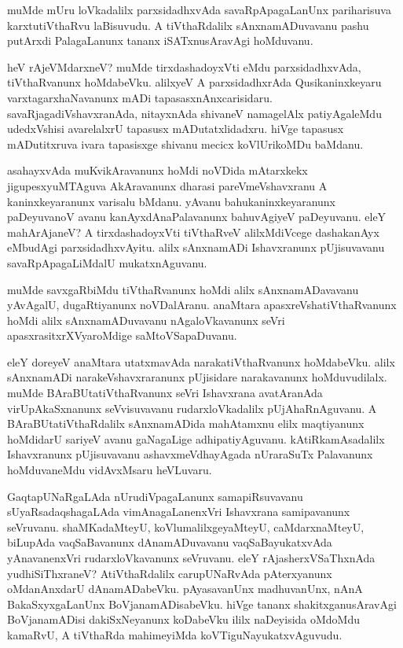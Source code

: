 \documentclass{article}
\begin{document}
\begin{mn}
muMde mUru loVkadalilx parxsidadhxvAda savaRpApagaLanUnx pariharisuva karxtutiVthaRvu laBisuvudu.
A tiVthaRdalilx sAnxnamADuvavanu pashu putArxdi PalagaLanunx tananx iSATxnusAravAgi hoMduvanu.
\end{mn}

\begin{mn}
heV rAjeVMdarxneV? muMde tirxdashadoyxVti eMdu parxsidadhxvAda, tiVthaRvanunx hoMdabeVku. 
alilxyeV A parxsidadhxrAda Qusikaninxkeyaru varxtagarxhaNavanunx mADi tapasasxnAnxcarisidaru. 
savaRjagadiVshavxranAda, nitayxnAda shivaneV namagelAlx patiyAgaleMdu udedxVshisi avarelalxrU 
tapasusx mADutatxlidadxru. hiVge tapasusx mADutitxruva ivara tapasisxge shivanu mecicx 
koVlUrikoMDu baMdanu.
\end{mn}

\begin{mn}
asahayxvAda muKvikAravanunx hoMdi noVDida mAtarxkekx jigupesxyuMTAguva AkAravanunx dharasi 
pareVmeVshavxranu A kaninxkeyaranunx varisalu bMdanu. yAvanu bahukaninxkeyaranunx paDeyuvanoV 
avanu kanAyxdAnaPalavanunx bahuvAgiyeV paDeyuvanu. eleY mahArAjaneV? A tirxdashadoyxVti tiVthaRveV
alilxMdiVcege dashakanAyx eMbudAgi parxsidadhxvAyitu. alilx sAnxnamADi Ishavxranunx pUjisuvavanu 
savaRpApagaLiMdalU mukatxnAguvanu.
\end{mn}

\begin{mn}
muMde savxgaRbiMdu tiVthaRvanunx hoMdi alilx sAnxnamADavavanu yAvAgalU, dugaRtiyanunx noVDalAranu.
anaMtara apasxreVshatiVthaRvanunx hoMdi alilx sAnxnamADuvavanu nAgaloVkavanunx seVri 
apasxrasitxrXVyaroMdige saMtoVSapaDuvanu.
\end{mn}

\begin{mn}
eleY doreyeV anaMtara utatxmavAda narakatiVthaRvanunx hoMdabeVku. alilx sAnxnamADi 
narakeVshavxraranunx pUjisidare narakavanunx hoMduvudilalx. muMde BAraBUtatiVthaRvanunx seVri 
Ishavxrana avatAranAda virUpAkaSxnanunx seVvisuvavanu rudarxloVkadalilx pUjAhaRnAguvanu. 
A BAraBUtatiVthaRdalilx  sAnxnamADida mahAtamxnu elilx maqtiyanunx hoMdidarU sariyeV avanu 
gaNagaLige adhipatiyAguvanu. kAtiRkamAsadalilx Ishavxranunx pUjisuvavanu ashavxmeVdhayAgada 
nUraraSuTx Palavanunx hoMduvaneMdu vidAvxMsaru heVLuvaru.
\end{mn}

\begin{mn}
GaqtapUNaRgaLAda nUrudiVpagaLanunx samapiRsuvavanu sUyaRsadaqshagaLAda vimAnagaLanenxVri 
Ishavxrana samipavanunx seVruvanu. shaMKadaMteyU, koVlumalilxgeyaMteyU, caMdarxnaMteyU,
biLupAda vaqSaBavanunx dAnamADuvavanu vaqSaBayukatxvAda yAnavanenxVri rudarxloVkavanunx 
seVruvanu. eleY rAjasherxVSaThxnAda yudhiSiThxraneV? AtiVthaRdalilx carupUNaRvAda pAterxyanunx 
oMdanAnxdarU dAnamADabeVku. pAyasavanUnx  madhuvanUnx, nAnA BakaSxyxgaLanUnx BoVjanamADisabeVku.
hiVge tananx shakitxganusAravAgi BoVjanamADisi dakiSxNeyanunx koDabeVku ililx naDeyisida oMdoMdu 
kamaRvU, A tiVthaRda mahimeyiMda koVTiguNayukatxvAguvudu.
\end{mn}
\end{document}
